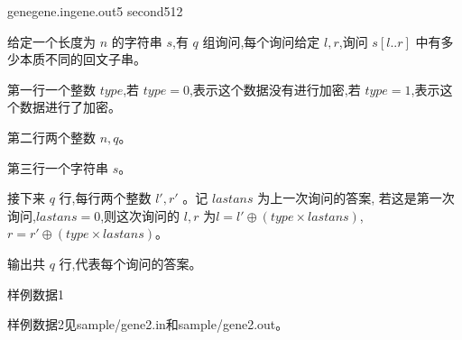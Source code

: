 \documentclass[11pt,a4paper,oneside]{article}
\begin{document}
\begin{problem}{gene}{gene.in}{gene.out}{5 second}{512}
	
	给定一个长度为 $n$ 的字符串 $s$,有 $q$ 组询问,每个询问给定 $l, r$,询问
	$s[l..r]$ 中有多少本质不同的回文子串。
	
	\InputFile
	
	第一行一个整数 $type$,若 $type = 0$,表示这个数据没有进行加密,若
	$type = 1$,表示这个数据进行了加密。
	
	第二行两个整数 $n, q$。
	
	第三行一个字符串 $s$。
	
	接下来 $q$ 行,每行两个整数 $l' , r'$ 。记 $lastans$ 为上一次询问的答案,
	若这是第一次询问,$lastans = 0$,则这次询问的 $l, r$ 为$l = l'\oplus (type \times
	lastans)$, $r = r'\oplus (type \times lastans)$。
	
	\OutputFile
	
	输出共 $q$ 行,代表每个询问的答案。
	
	\Example
	
	样例数据1
	
	\begin{example}
	\end{example}
	
	样例数据2见sample/gene2.in和sample/gene2.out。
	
	\Note
	

\end{problem}
\end{document}
